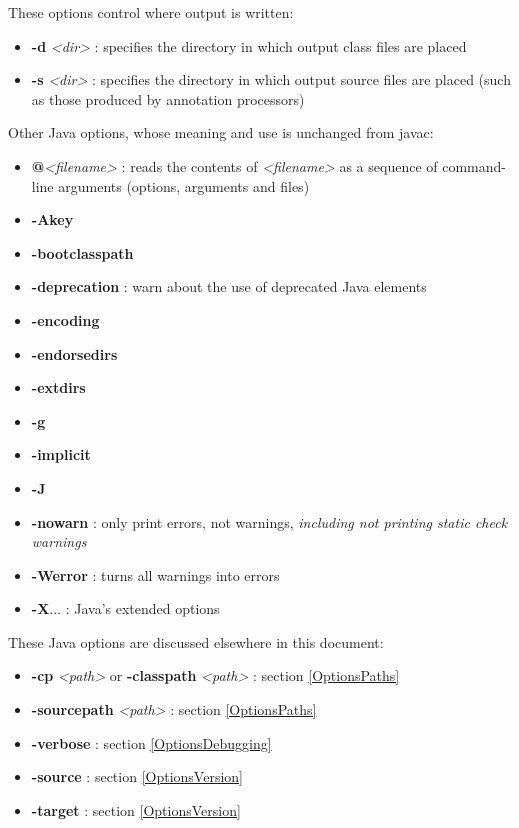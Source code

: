 \documentclass{report}%
\begin{document}
These options control where output is written:
\begin{itemize}
\item \textbf{-d} {\it <dir>} : specifies the directory in which output class files are placed
\item \textbf{-s} {\it <dir>} : specifies the directory in which output source files are placed (such as those produced by annotation processors)
\end{itemize}

Other Java options, whose meaning and use is unchanged from javac:
\begin{itemize}
\item \textbf{@}\textit{<filename>} : reads the contents of \textit{<filename>} as a sequence of command-line arguments (options, arguments and files)
\item \textbf{-Akey}
\item \textbf{-bootclasspath}
\item \textbf{-deprecation} : warn about the use of deprecated Java elements
\item \textbf{-encoding}
\item \textbf{-endorsedirs}
\item \textbf{-extdirs}
\item \textbf{-g}
\item \textbf{-implicit}
\item \textbf{-J}
\item \textbf{-nowarn} : only print errors, not warnings, \textit{including not printing static check warnings}
\item \textbf{-Werror} : turns all warnings into errors
\item \textbf{-X}... : Java's extended options
\end{itemize}

These Java options are discussed elsewhere in this document:
\begin{itemize}
\item \textbf{-cp} \textit{<path>} or \textbf{-classpath} \textit{<path>} : section \ref{OptionsPaths}
\item \textbf{-sourcepath} \textit{<path>} : section \ref{OptionsPaths}
\item \textbf{-verbose} : section \ref{OptionsDebugging}
\item \textbf{-source} : section \ref{OptionsVersion}
\item \textbf{-target} : section \ref{OptionsVersion}
\end{itemize}
\end{document}
